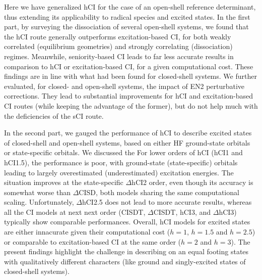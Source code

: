 \documentclass[aip,jcp,reprint,noshowkeys,superscriptaddress]{revtex4-1}
\begin{document}

Here we have generalized hCI \cite{Kossoski_2022} for the case of an open-shell reference determinant, thus extending its applicability to radical species and excited states.
In the first part,
by surveying the dissociation of several open-shell systems, 
we found that the hCI route generally outperforms excitation-based CI, for both weakly correlated (equilibrium geometries) and strongly correlating (dissociation) regimes.
Meanwhile, seniority-based CI leads to far less accurate results in comparison to hCI or excitation-based CI, for a given computational cost.
These findings are in line with what had been found for closed-shell systems. \cite{Kossoski_2022}
We further evaluated, for closed- and open-shell systems, the impact of EN2 perturbative corrections.
They lead to substantial improvements for hCI and excitation-based CI routes (while keeping the advantage of the former), 
but do not help much with the deficiencies of the sCI route.

In the second part,
we gauged the performance of hCI to describe excited states of closed-shell and open-shell systems, based on either HF ground-state orbitals or state-specific orbitals.
We discussed the 
%
For lower orders of hCI (hCI1 and hCI1.5), the performance is poor,
with ground-state (state-specific) orbitals leading to largely overestimated (underestimated) excitation energies.
The situation improves at the state-specific $\Delta$hCI2 order, even though its accuracy is somewhat worse than $\Delta$CISD, both models sharing the same computational scaling. 
Unfortunately, $\Delta$hCI2.5 does not lead to more accurate results, whereas all the CI models at next next order (CISDT, $\Delta$CISDT, hCI3, and $\Delta$hCI3) typically show comparable performances.
Overall, hCI models for excited states are either innacurate given their computational cost ($h=1$, $h=1.5$ and $h=2.5$) or comparable to excitation-based CI at the same order ($h=2$ and $h=3$).
The present findings highlight the challenge in describing on an equal footing states with qualitatively different characters (like ground and singly-excited states of closed-shell systems).
\end{document}
